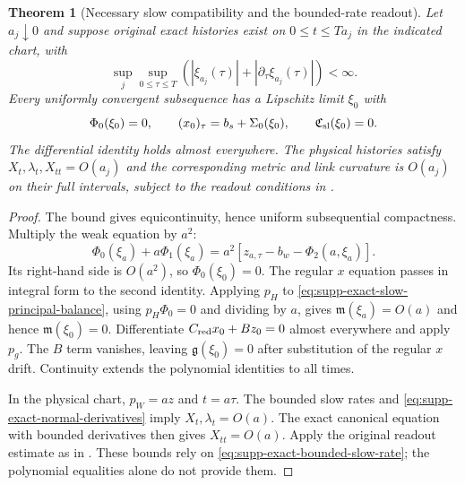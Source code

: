 \documentclass[11pt]{article}
\newtheorem{theorem}{Theorem}[section]
\numberwithin{equation}{section}
\theoremstyle{definition}
\theoremstyle{remark}
\begin{document}
\begin{theorem}[Necessary slow compatibility and the bounded-rate readout]
\label{thm:supp-exact-five-compatibility}
Let $a_j\downarrow0$ and suppose original exact histories exist on
$0\le t\le Ta_j$ in the indicated chart, with
\begin{equation}
 \sup_j\sup_{0\le\tau\le T}
       (|\xi_{a_j}(\tau)|+|\partial_\tau\xi_{a_j}(\tau)|)<\infty.
 \label{eq:supp-exact-bounded-slow-rate}
\end{equation}
Every uniformly convergent subsequence has a Lipschitz limit $\xi_0$ with
\begin{equation}
 \Phi_0(\xi_0)=0,\qquad
 (x_0)_\tau=b_s+\Sigma_0(\xi_0),\qquad
 \mathfrak C_{\rm sl}(\xi_0)=0.
 \label{eq:supp-exact-five-identities}
\end{equation}
The differential identity holds almost everywhere. The physical histories
satisfy $X_t,\lambda_t,X_{tt}=O(a_j)$ and the corresponding metric and link
curvature is $O(a_j)$ on their full intervals, subject to the readout
conditions in .
\end{theorem}
\begin{proof}
The bound gives equicontinuity, hence uniform subsequential compactness.
Multiply the weak equation by $a^2$:
\begin{equation}
 \Phi_0(\xi_a)+a\Phi_1(\xi_a)
    =a^2[z_{a,\tau}-b_w-\Phi_2(a,\xi_a)].
 \label{eq:supp-exact-slow-principal-balance}
\end{equation}
Its right-hand side is $O(a^2)$, so $\Phi_0(\xi_0)=0$. The regular $x$
equation passes in integral form to the second identity. Applying $p_H$
to \eqref{eq:supp-exact-slow-principal-balance}, using $p_H\Phi_0=0$ and
dividing by $a$, gives $\mathfrak m(\xi_a)=O(a)$ and hence
$\mathfrak m(\xi_0)=0$. Differentiate
$C_{\rm red}x_0+Bz_0=0$ almost everywhere and apply $p_g$. The $B$ term
vanishes, leaving $\mathfrak g(\xi_0)=0$ after substitution of the regular
$x$ drift. Continuity extends the polynomial identities to all times.

In the physical chart, $p_W=az$ and $t=a\tau$.
The bounded slow rates and \eqref{eq:supp-exact-normal-derivatives} imply
$X_t,\lambda_t=O(a)$. The exact canonical equation with bounded
derivatives then gives $X_{tt}=O(a)$. Apply the original readout estimate
as in . These bounds rely on
\eqref{eq:supp-exact-bounded-slow-rate}; the polynomial equalities alone
do not provide them.
\end{proof}
\end{document}
